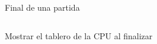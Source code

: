 \begin{frame}
    \begin{columns}
        \column{\dimexpr\paperwidth-10pt}
        \begin{figure}
            \caption{Final de una partida}
          \end{figure}
      \end{columns}
\end{frame}

\begin{frame}
    \begin{columns}
        \column{\dimexpr\paperwidth-10pt}
        \begin{figure}
            \caption{Mostrar el tablero de la CPU al finalizar}
          \end{figure}
      \end{columns}
\end{frame}

